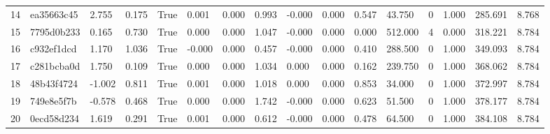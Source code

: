 \begin{table}[t]
\begin{tabular}{llllllllllllllll}
14 & ea35663c45 & 2.755 & 0.175 & True & 0.001 & 0.000 & 0.993 & -0.000 & 0.000 & 0.547 & 43.750 & 0 & 1.000 & 285.691 & 8.768 \\
15 & 7795d0b233 & 0.165 & 0.730 & True & 0.000 & 0.000 & 1.047 & -0.000 & 0.000 & 0.000 & 512.000 & 4 & 0.000 & 318.221 & 8.784 \\
16 & c932ef1dcd & 1.170 & 1.036 & True & -0.000 & 0.000 & 0.457 & -0.000 & 0.000 & 0.410 & 288.500 & 0 & 1.000 & 349.093 & 8.784 \\
17 & c281bcba0d & 1.750 & 0.109 & True & 0.000 & 0.000 & 1.034 & 0.000 & 0.000 & 0.162 & 239.750 & 0 & 1.000 & 368.062 & 8.784 \\
18 & 48b43f4724 & -1.002 & 0.811 & True & 0.001 & 0.000 & 1.018 & 0.000 & 0.000 & 0.853 & 34.000 & 0 & 1.000 & 372.997 & 8.784 \\
19 & 749e8e5f7b & -0.578 & 0.468 & True & 0.000 & 0.000 & 1.742 & -0.000 & 0.000 & 0.623 & 51.500 & 0 & 1.000 & 378.177 & 8.784 \\
20 & 0ecd58d234 & 1.619 & 0.291 & True & 0.001 & 0.000 & 0.612 & -0.000 & 0.000 & 0.478 & 64.500 & 0 & 1.000 & 384.108 & 8.784 \\
\bottomrule
\end{tabular}
\end{table}

